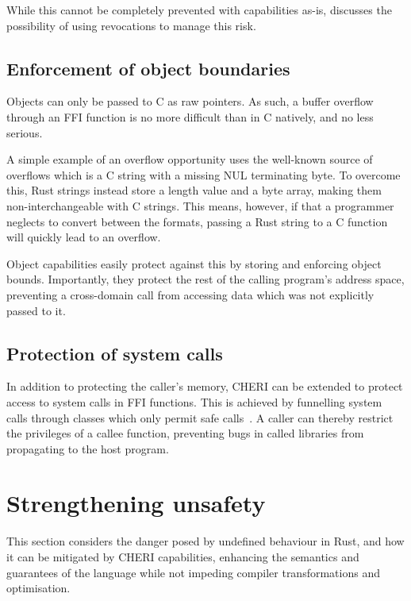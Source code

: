 \documentclass[dissertation.tex]{subfiles}
\begin{document}
While this cannot be completely prevented with capabilities as-is,
 discusses the possibility of using
revocations to manage this risk.

\subsection{Enforcement of object boundaries}

Objects can only be passed to C as raw pointers.
As such, a buffer overflow through an FFI function is no more difficult
than in C natively, and no less serious.

A simple example of an overflow opportunity uses the well-known source
of overflows which is a C string with a missing NUL terminating byte.
To overcome this, Rust strings instead store a length value and a byte
array, making them non-interchangeable with C strings.
This means, however, if that a programmer neglects to convert between
the formats, passing a Rust string to a C function will quickly lead to
an overflow.

Object capabilities easily protect against this by storing and enforcing
object bounds.
Importantly, they protect the rest of the calling program's address
space, preventing a cross-domain call from accessing data which was not
explicitly passed to it.

\subsection{Protection of system calls}
In addition to protecting the caller's memory, CHERI can be extended to
protect access to system calls in FFI functions.
This is achieved by funnelling system calls through classes which only
permit safe calls~\cite{cheri2015}.
A caller can thereby restrict the privileges of a callee function,
preventing bugs in called libraries from propagating to the host
program.


\section{Strengthening unsafety}
\label{sec:eval-betterunsafe}

This section considers the danger posed by undefined behaviour in Rust,
and how it can be mitigated by CHERI capabilities, enhancing the
semantics and guarantees of the language while not impeding compiler
transformations and optimisation.
\end{document}
